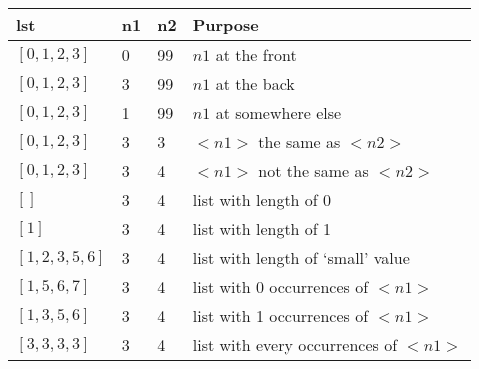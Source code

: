 \documentclass[12pt]{article}
\begin{document}
\begin{itemize}
\begin{mdframed}
        \begin{tabular}{|p{5cm}|p{1cm}|p{1cm}|p{6cm}|}
            \hline
            \textbf{lst} & \textbf{n1} & \textbf{n2} & \textbf{Purpose}\\
            \hline
            $[0,1,2,3]$ & 0 & 99 & $n1$ at the front\\
            \hline
            $[0,1,2,3]$ & \color{red}3\color{black} & 99 & $n1$ at the back\\
            \hline
            $[0,1,2,3]$ & \color{red}1\color{black} & 99 & $n1$ at somewhere else\\
            \hline
            $[0,1,2,3]$ & 3 & 3 & $<n1>$ the same as $<n2>$\\
            \hline
            $[0,1,2,3]$ & 3 & 4 & $<n1>$ not the same as $<n2>$\\
            \hline
            $[]$ & 3 & 4 & list with length of 0\\
            \hline
            $[1]$ & 3 & 4 & list with length of 1\\
            \hline
            $[1,2,3,5,6]$ & 3 & 4 & list with length of `small' value\\
            \hline
            $[1,5,6,7]$ & 3 & 4 & list with 0 occurrences of $<n1>$\\
            \hline
            $[1,3,5,6]$ & 3 & 4 & list with 1 occurrences of $<n1>$\\
            \hline
            $[3,3,3,3]$ & 3 & 4 & list with every occurrences of $<n1>$\\
            \hline
        \end{tabular}
    \end{mdframed}
\end{itemize}
\end{document}
